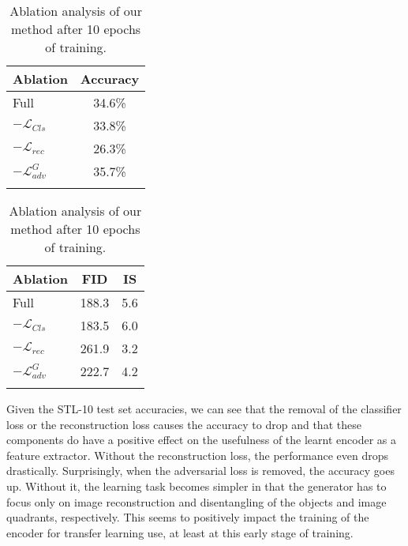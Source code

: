 \documentclass[a4paper,12pt]{report}
\begin{document}
\begin{table}[ht!]
    \begin{subtable}{.5\linewidth}
      \centering
        \begin{tabular}{l c}
        \Xhline{0.8pt}
        \textbf{Ablation} & \textbf{Accuracy} \\
        \hline
        Full & 34.6\% \\ %
        $-\mathcal{L}_{Cls}$ & 33.8\% \\ %
        $-\mathcal{L}_{rec}$ & 26.3\% \\ %
        $-\mathcal{L}^G_{adv}$ & 35.7\% \\ %
        \Xhline{0.8pt}
        \end{tabular}
        \caption{STL-10 test set accuracy}
    \end{subtable}%
    \begin{subtable}{.5\linewidth}
      \centering
        \begin{tabular}{l c c}
        \Xhline{0.8pt}
        \textbf{Ablation} & \textbf{FID} & \textbf{IS} \\
        \hline
        Full & 188.3 & 5.6\\ %
        $-\mathcal{L}_{Cls}$ & 183.5 & 6.0\\ %
        $-\mathcal{L}_{rec}$ & 261.9 & 3.2\\ %
        $-\mathcal{L}^G_{adv}$ & 222.7 & 4.2\\ %
        \Xhline{0.8pt}
        \end{tabular}
        \caption{FID and IS results}
    \end{subtable} 
    \caption{Ablation analysis of our method after 10 epochs of training.}
    \label{tab:ablation_stL10}
\end{table}

Given the STL-10 test set accuracies, we can see that the removal of the classifier loss or the reconstruction loss causes the accuracy to drop and that these components do have a positive effect on the usefulness of the learnt encoder as a feature extractor. Without the reconstruction loss, the performance even drops drastically. Surprisingly, when the adversarial loss is removed, the accuracy goes up. Without it, the learning task becomes simpler in that the generator has to focus only on image reconstruction and disentangling of the objects and image quadrants, respectively. This seems to positively impact the training of the encoder for transfer learning use, at least at this early stage of training. 
\end{document}

